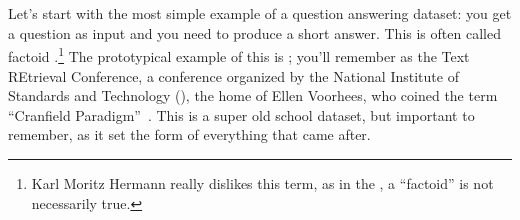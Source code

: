 \newcommand{\datasetplotaxes}{%
  \draw[->,very thick] (0,2) -- (9.8,2);
  \node[font=\bfseries] at (6.7,1.6) {Difficulty of Prompt};
  \draw[<->,very thick] (0.45,0) -- (0.45,5.25);
  \node[anchor=west,font=\bfseries,align=left] at (0.75,5.0) {Difficulty\\of Answer};
}
\newcommand{\datasetcranfield}[2]{%
  \node[draw,circle,inner sep=1.4pt,fill=white] at (#1,#2) {?};
}
\newcommand{\datasetpawn}[2]{%
  \begin{scope}[shift={(#1,#2)},x=0.055cm,y=0.055cm,line width=0.35pt]
    \draw[fill=white] (-3,-3) rectangle (3,-2);
    \draw[fill=white] (-2.2,-2) -- (2.2,-2) -- (1.25,-0.9) -- (-1.25,-0.9) -- cycle;
    \draw[fill=white] (-1.4,-0.9) .. controls (-0.9,-0.2) and (0.9,-0.2) .. (1.4,-0.9);
    \draw[fill=white] (0,0.85) circle (1.05);
  \end{scope}
}
\newcommand{\datasetbuzzer}[2]{%
  \begin{scope}[shift={(#1,#2)},x=0.055cm,y=0.055cm,line width=0.35pt]
    \draw[fill=white] (-3,-2.2) rectangle (3,-1);
    \draw[fill=white] (-1.8,-1) -- (1.8,-1) -- (1.1,0.1) -- (-1.1,0.1) -- cycle;
    \draw[fill=white] (-0.35,0.1) rectangle (0.35,1.4);
    \draw[fill=white] (0,1.75) circle (0.85);
  \end{scope}
}
\newcommand{\datasetplotkey}[2]{%
  \begin{scope}[shift={(#1,#2)}]
    \draw (0,0) rectangle (3.65,0.95);
    \datasetcranfield{0.35}{0.68}
    \node[anchor=west] at (0.62,0.68) {Cranfield};
    \datasetbuzzer{2.05}{0.68}
    \node[anchor=west] at (2.32,0.68) {Manchester};
    \datasetpawn{0.35}{0.25}
    \node[anchor=west] at (0.62,0.25) {crowdsourced};
  \end{scope}
}
\newcommand{\nqtablequestion}[1]{\emph{``#1''}}

\section{\trecqa{}}

Let’s start with the most simple example of a question answering
dataset: you get a question as input and you need to produce a short
answer.
%
This is often called factoid .\footnote{Karl Moritz Hermann
  really dislikes this term, as in the , a ``factoid'' is not
  necessarily true.}
%
The prototypical example of this is \trecqa{}; you'll remember
 as the Text REtrieval Conference, a conference organized by
the  National Institute of Standards and Technology
(), the home of Ellen Voorhees, who coined the term
``Cranfield Paradigm''~\citep{voorhees-00,voorhees-03}.
%
This is a super old school dataset, but important to remember, as it
set the form of everything that came after.

